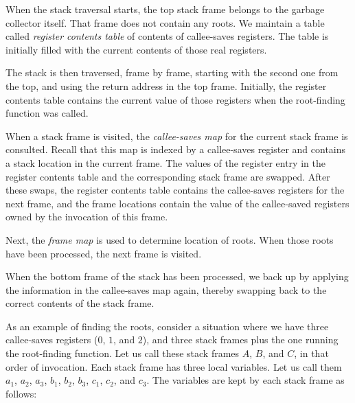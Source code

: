 When the stack traversal starts, the top stack frame belongs to the
garbage collector itself.  That frame does not contain any roots.  We
maintain a table called \emph{register contents table} of contents of
callee-saves registers.  The table is initially filled with the
current contents of those real registers.

The stack is then traversed, frame by frame, starting with the second
one from the top, and using the return address in the top frame.
Initially, the register contents table contains the current value of
those registers when the root-finding function was called.

When a stack frame is visited, the \emph{callee-saves map} for the
current stack frame is consulted.  Recall that this map is indexed by
a callee-saves register and contains a stack location in the current
frame.  The values of the register entry in the register contents
table and the corresponding stack frame are swapped.  After these
swaps, the register contents table contains the callee-saves
registers for the next frame, and the frame locations contain the
value of the callee-saved registers owned by the invocation of this
frame.

Next, the \emph{frame map} is used to determine location of roots.
When those roots have been processed, the next frame is visited.

When the bottom frame of the stack has been processed, we back up by
applying the information in the callee-saves map again, thereby
swapping back to the correct contents of the stack frame.

As an example of finding the roots, consider a situation where we have
three callee-saves registers ($0$, $1$, and $2$), and three stack
frames plus the one running the root-finding function.  Let us call
these stack frames $A$, $B$, and $C$, in that order of invocation.
Each stack frame has three local variables.  Let us call them $a_1$,
$a_2$, $a_3$, $b_1$, $b_2$, $b_3$, $c_1$, $c_2$, and $c_3$.  The
variables are kept by each stack frame as follows:

